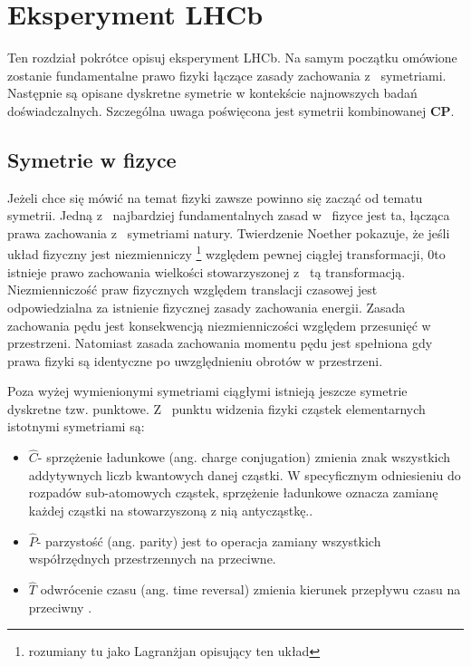 \chapter{Eksperyment LHCb}

Ten rozdział pokrótce opisuj eksperyment LHCb. Na samym początku omówione zostanie fundamentalne prawo fizyki łączące zasady zachowania z~ symetriami. Następnie są opisane dyskretne symetrie w kontekście najnowszych badań doświadczalnych. Szczególna uwaga poświęcona jest symetrii kombinowanej \textbf{CP}.    

\section{Symetrie w fizyce}
Jeżeli chce się mówić na temat fizyki zawsze powinno się zacząć od tematu symetrii. Jedną z~ najbardziej fundamentalnych zasad w~ fizyce jest ta, łącząca prawa zachowania z~ symetriami natury. Twierdzenie Noether \cite{Noether} pokazuje, że jeśli układ fizyczny jest niezmienniczy \footnote{rozumiany tu jako Lagranżjan opisujący ten układ} względem pewnej ciągłej transformacji, 0to istnieje prawo zachowania wielkości stowarzyszonej z~ tą transformacją. Niezmienniczość praw fizycznych względem translacji czasowej jest odpowiedzialna za istnienie fizycznej zasady zachowania energii. Zasada zachowania pędu jest konsekwencją niezmienniczości względem przesunięć w przestrzeni. Natomiast zasada zachowania momentu pędu jest spełniona gdy prawa fizyki są identyczne po uwzględnieniu obrotów w przestrzeni. 

Poza wyżej wymienionymi symetriami ciągłymi istnieją jeszcze symetrie dyskretne tzw. punktowe. Z~ punktu widzenia fizyki cząstek elementarnych istotnymi symetriami są:

\begin{itemize}
\item \textbf{$\hat{C}$}- sprzężenie ładunkowe (ang. charge conjugation) zmienia znak wszystkich addytywnych liczb kwantowych danej cząstki. W specyficznym odniesieniu do rozpadów sub-atomowych cząstek, sprzężenie ładunkowe oznacza zamianę każdej cząstki na stowarzyszoną z nią antycząstkę.\cite{symmetry}.
\item \textbf{$\hat{P}$}- parzystość (ang. parity) jest to operacja zamiany wszystkich współrzędnych przestrzennych na przeciwne. \cite{symmetry}
\item \textbf{$\hat{T}$} odwrócenie czasu (ang. time reversal) zmienia kierunek przepływu czasu na przeciwny \cite{symmetry}.
\end{itemize}

